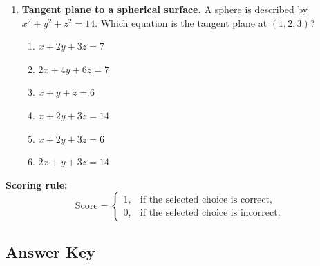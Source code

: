 \documentclass[a4paper,12pt]{article}
\theoremstyle{mystyle}
\numberwithin{equation}{section}
\numberwithin{theorem}{section}
\numberwithin{proposition}{section}
\numberwithin{example}{section}
\numberwithin{remark}{section}
\numberwithin{lemma}{section}
\numberwithin{corollary}{section}
\numberwithin{definition}{section}
\begin{document}
\begin{enumerate}[label=\textbf{Question \arabic*.},leftmargin=*]
\item \textbf{Tangent plane to a spherical surface.} A sphere is described by $x^2+y^2+z^2=14$. Which equation is the tangent plane at $(1,2,3)$?
\begin{enumerate}[label=(\Alph*)]
\item $x+2y+3z=7$
\item $2x+4y+6z=7$
\item $x+y+z=6$
\item $x+2y+3z=14$
\item $x+2y+3z=6$
\item $2x+y+3z=14$
\end{enumerate}

\end{enumerate}


\noindent
\textbf{Scoring rule:}
\[
\text{Score}=
\begin{cases}
1, & \text{if the selected choice is correct},\\
0, & \text{if the selected choice is incorrect}.
\end{cases}
\]
\subsection{Answer Key}
\end{document}
